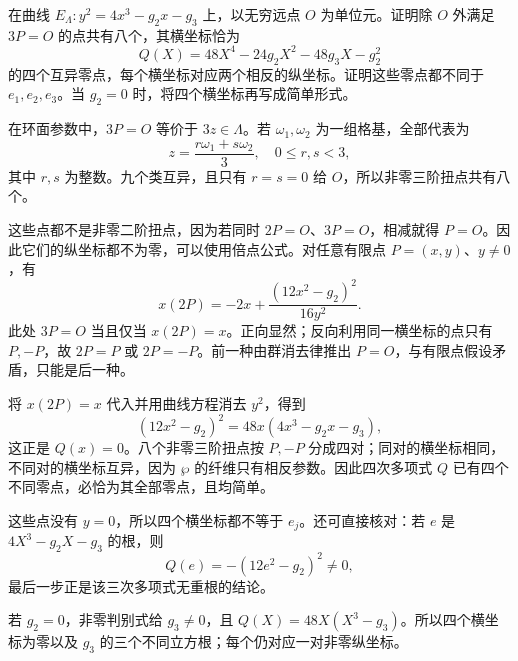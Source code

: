 \begin{exercise}[三阶扭点的横坐标]\label{b3:ex:22-4}
在曲线 \(E_\Lambda:y^2=4x^3-g_2x-g_3\) 上，以无穷远点 \(O\) 为单位元。证明除 \(O\) 外满足 \(3P=O\) 的点共有八个，其横坐标恰为
\[
 Q(X)=48X^4-24g_2X^2-48g_3X-g_2^2
\]
的四个互异零点，每个横坐标对应两个相反的纵坐标。证明这些零点都不同于 \(e_1,e_2,e_3\)。当 \(g_2=0\) 时，将四个横坐标再写成简单形式。
\end{exercise}
\begin{solution}
在环面参数中，\(3P=O\) 等价于 \(3z\in\Lambda\)。若 \(\omega_1,\omega_2\) 为一组格基，全部代表为
\[
 z=\frac{r\omega_1+s\omega_2}{3},\quad0\le r,s<3,
\]
其中 \(r,s\) 为整数。九个类互异，且只有 \(r=s=0\) 给 \(O\)，所以非零三阶扭点共有八个。

这些点都不是非零二阶扭点，因为若同时 \(2P=O\)、\(3P=O\)，相减就得 \(P=O\)。因此它们的纵坐标都不为零，可以使用倍点公式。对任意有限点 \(P=(x,y)\)、\(y\ne0\)，有
\[
 x(2P)=-2x+\frac{(12x^2-g_2)^2}{16y^2}.
\]
此处 \(3P=O\) 当且仅当 \(x(2P)=x\)。正向显然；反向利用同一横坐标的点只有 \(P,-P\)，故 \(2P=P\) 或 \(2P=-P\)。前一种由群消去律推出 \(P=O\)，与有限点假设矛盾，只能是后一种。

将 \(x(2P)=x\) 代入并用曲线方程消去 \(y^2\)，得到
\[
 (12x^2-g_2)^2=48x(4x^3-g_2x-g_3),
\]
这正是 \(Q(x)=0\)。八个非零三阶扭点按 \(P,-P\) 分成四对；同对的横坐标相同，不同对的横坐标互异，因为 \(\wp\) 的纤维只有相反参数。因此四次多项式 \(Q\) 已有四个不同零点，必恰为其全部零点，且均简单。

这些点没有 \(y=0\)，所以四个横坐标都不等于 \(e_j\)。还可直接核对：若 \(e\) 是 \(4X^3-g_2X-g_3\) 的根，则
\[
 Q(e)=-(12e^2-g_2)^2\ne0,
\]
最后一步正是该三次多项式无重根的结论。

若 \(g_2=0\)，非零判别式给 \(g_3\ne0\)，且 \(Q(X)=48X(X^3-g_3)\)。所以四个横坐标为零以及 \(g_3\) 的三个不同立方根；每个仍对应一对非零纵坐标。
\end{solution}

